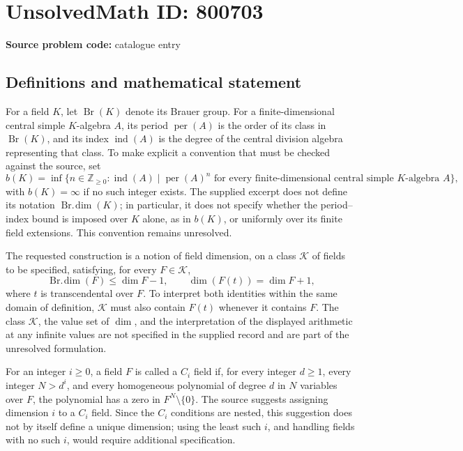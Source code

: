 \documentclass[11pt]{article}
\newcommand{\Z}{\mathbb{Z}}
\begin{document}
\section*{UnsolvedMath ID: 800703}
\textbf{Source problem code:} catalogue entry
\subsection{Definitions and mathematical statement}
For a field \(K\), let \(\operatorname{Br}(K)\) denote its Brauer group. For a finite-dimensional central simple \(K\)-algebra \(A\), its period \(\operatorname{per}(A)\) is the order of its class in \(\operatorname{Br}(K)\), and its index \(\operatorname{ind}(A)\) is the degree of the central division algebra representing that class. To make explicit a convention that must be checked against the source, set
\[
b(K)=\inf\bigl\{n\in\Z_{\geq 0}:\operatorname{ind}(A)\mid\operatorname{per}(A)^n\text{ for every finite-dimensional central simple }K\text{-algebra }A\bigr\},
\]
with \(b(K)=\infty\) if no such integer exists. The supplied excerpt does not define its notation \(\operatorname{Br.\!dim}(K)\); in particular, it does not specify whether the period--index bound is imposed over \(K\) alone, as in \(b(K)\), or uniformly over its finite field extensions. This convention remains unresolved.

The requested construction is a notion of field dimension, on a class \(\mathcal K\) of fields to be specified, satisfying, for every \(F\in\mathcal K\),
\[
\operatorname{Br.\!dim}(F)\leq \dim F-1,
\qquad
\dim(F(t))=\dim F+1,
\]
where \(t\) is transcendental over \(F\). To interpret both identities within the same domain of definition, \(\mathcal K\) must also contain \(F(t)\) whenever it contains \(F\). The class \(\mathcal K\), the value set of \(\dim\), and the interpretation of the displayed arithmetic at any infinite values are not specified in the supplied record and are part of the unresolved formulation.

For an integer \(i\geq 0\), a field \(F\) is called a \(C_i\) field if, for every integer \(d\geq 1\), every integer \(N>d^i\), and every homogeneous polynomial of degree \(d\) in \(N\) variables over \(F\), the polynomial has a zero in \(F^N\setminus\{0\}\). The source suggests assigning dimension \(i\) to a \(C_i\) field. Since the \(C_i\) conditions are nested, this suggestion does not by itself define a unique dimension; using the least such \(i\), and handling fields with no such \(i\), would require additional specification.
\end{document}
